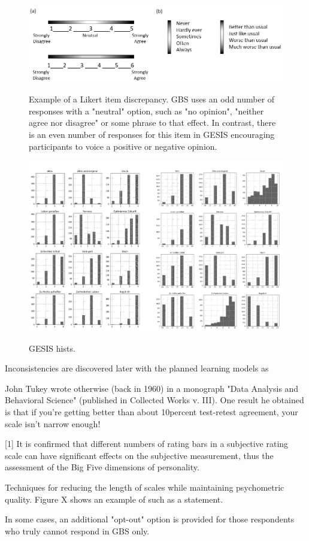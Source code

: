 \begin{figure}[ht]
	\begin{center}
		\includegraphics[scale=0.50,angle=0]{fig/scales}
		\label{6_5}
		\caption{Example of a Likert item discrepancy. GBS uses an odd number of responses with a "neutral" option, such as "no opinion", "neither agree nor disagree" or some phrase to that effect. In contrast, there is an even number of responses for this item in GESIS encouraging participants to voice a positive or negative opinion.}
	\end{center}
\end{figure}


\begin{figure}[ht]
	\begin{center}
		\includegraphics[scale=0.62,angle=0]{fig/histo}
		\label{std}
		\caption{GESIS hists.}
	\end{center}
\end{figure}

Inconsistencies are discovered later with the planned learning models as 

John Tukey wrote otherwise (back in 1960) in a monograph "Data Analysis and Behavioral Science" (published in Collected Works v. III). One result he obtained is that if you're getting better than about 10percent test-retest agreement, your scale isn't narrow enough!

[1] It is confirmed that different numbers of rating bars in a subjective rating scale can have significant effects on the subjective measurement, thus the assessment of the Big Five dimensions of personality.

Techniques for reducing the length of scales while maintaining psychometric quality.
Figure X shows an example of such as a statement.

In some cases, an additional "opt-out" option is provided for those respondents who truly cannot respond in GBS only.

